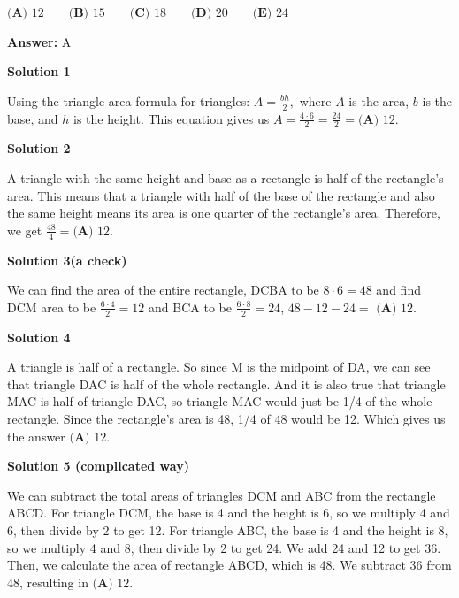 \begin{enumerate}
$\textbf{(A) }12\qquad\textbf{(B) }15\qquad\textbf{(C) }18\qquad\textbf{(D) }20\qquad \textbf{(E) }24$

 \textbf{Answer: }A



\textbf{Solution 1}

Using the triangle area formula for triangles: $A = \frac{bh}{2},$ where $A$ is the area, $b$ is the base, and $h$ is the height. This equation gives us $A = \frac{4 \cdot 6}{2} = \frac{24}{2} =\boxed{\textbf{(A) } 12}$.

 



\textbf{Solution 2}

A triangle with the same height and base as a rectangle is half of the rectangle's area.  This means that a triangle with half of the base of the rectangle and also the same height means its area is one quarter of the rectangle's area.  Therefore, we get $\frac{48}{4} =\boxed{\textbf{(A) } 12}$.

 



\textbf{Solution 3(a check)}

We can find the area of the entire rectangle, DCBA to be $8 \cdot 6=48$ and find DCM area to be $\frac{6 \cdot 4}{2} = 12$ and BCA to be $\frac{6 \cdot 8}{2}=24$, $48-12-24=$ $\boxed{\textbf{(A) } 12}$.

 



\textbf{Solution 4}

A triangle is half of a rectangle. So since M is the midpoint of DA, we can see that triangle DAC is half of the whole rectangle. And it is also true that triangle MAC is half of triangle DAC, so triangle MAC would just be 1/4 of the whole rectangle. Since the rectangle's area is 48, 1/4 of 48 would be 12. Which gives us the answer $\boxed{\textbf{(A) } 12}$.

 



\textbf{Solution 5 (complicated way)}

We can subtract the total areas of triangles DCM and ABC from the rectangle ABCD. For triangle DCM, the base is 4 and the height is 6, so we multiply 4 and 6, then divide by 2 to get 12. For triangle ABC, the base is 4 and the height is 8, so we multiply 4 and 8, then divide by 2 to get 24. We add 24 and 12 to get 36. Then, we calculate the area of rectangle ABCD, which is 48. We subtract 36 from 48, resulting in $\boxed{\textbf{(A) } 12}$.


\end{enumerate}

